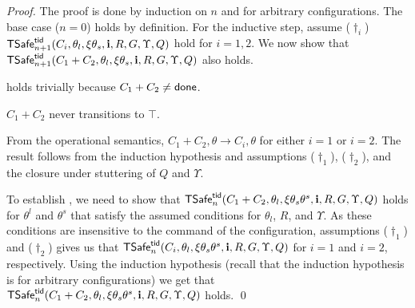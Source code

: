 \begin{proof}
The proof is done by induction on $n$ and for arbitrary configurations.
The base case ($n=0$) holds by definition.
For the inductive step, 
assume 
($\dagger_i$) ${\sf TSafe}^{{\sf tid}}_{n+1}(C_i,\theta_l,\xi\theta_s,{\bf i},R,G,\Upsilon,Q)$  
hold for $i=1,2$.
We now show that 
${\sf TSafe}^{{\sf tid}}_{n+1}(C_1 + C_2,\theta_l,\xi\theta_s,{\bf i},R,G,\Upsilon,Q)$ 
also holds.

 holds trivially 
 because $C_1 + C_2 \neq {\sf done}$.

$C_1 + C_2$ never transitions to $\top$.

From the operational semantics,
$C_1 + C_2, \theta \rightarrow C_i,\theta$ for either $i=1$ or $i=2$.
The result follows from  the induction hypothesis and assumptions 
($\dagger_1$), ($\dagger_2$), and the closure under stuttering of $Q$ and $\Upsilon$.





To establish , we need to show that 
${\sf TSafe}^{{\sf tid}}_n(C_1+C_2,\theta_l,\xi\theta_s\theta^s,{\bf i},R,G,\Upsilon,Q)$ holds
for $\theta^l$ and $\theta^s$ that satisfy the assumed conditions for $\theta_l$, $R$, and $\Upsilon$.
As these conditions are insensitive to the command of the configuration,
assumptions ($\dagger_1$) and ($\dagger_2$) 
gives us that 
${\sf TSafe}^{{\sf tid}}_n(C_i,\theta_l,\xi\theta_s\theta^s,{\bf i},R,G,\Upsilon,Q)$
for $i=1$ and $i=2$, respectively.
Using the induction hypothesis (recall that the induction hypothesis is for 
arbitrary configurations)
we get that ${\sf TSafe}^{{\sf tid}}_n(C_1+C_2,\theta_l,\xi\theta_s\theta^s,{\bf i},R,G,\Upsilon,Q)$ holds.
\qed\end{proof}


